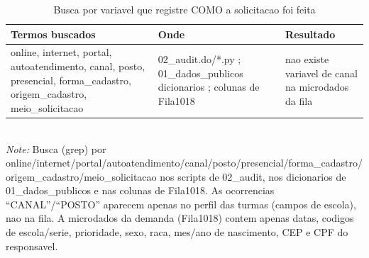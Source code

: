 \begin{table}[htbp]\centering
\caption{Busca por variavel que registre COMO a solicitacao foi feita}
\label{tab:S7d}
\small
\begin{tabular}{p{6cm}p{5cm}p{3.5cm}}
\toprule
Termos buscados & Onde & Resultado \\
\midrule
online, internet, portal, autoatendimento, canal, posto, presencial, forma\_cadastro, origem\_cadastro, meio\_solicitacao & 02\_audit\*.do/*.py ; 01\_dados\_publicos dicionarios ; colunas de Fila1018 & nao existe variavel de canal na microdados da fila \\
\bottomrule
\end{tabular}
\\[3pt]{\footnotesize \textit{Note:} Busca (grep) por online/internet/portal/autoatendimento/canal/posto/presencial/forma\_cadastro/origem\_cadastro/meio\_solicitacao nos scripts de 02\_audit, nos dicionarios de 01\_dados\_publicos e nas colunas de Fila1018. As ocorrencias ``CANAL''/``POSTO'' aparecem apenas no perfil das turmas (campos de escola), nao na fila. A microdados da demanda (Fila1018) contem apenas datas, codigos de escola/serie, prioridade, sexo, raca, mes/ano de nascimento, CEP e CPF do responsavel.}
\end{table}
